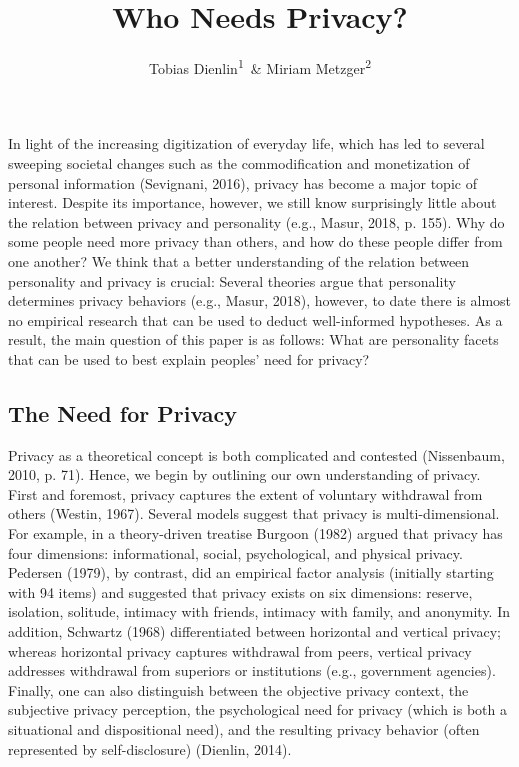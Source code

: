 \documentclass[man,floatsintext]{apa6}
\title{Who Needs Privacy?}
\author{Tobias Dienlin\textsuperscript{1}~\& Miriam Metzger\textsuperscript{2}}
\date{}
\affiliation{
\vspace{0.5cm}
\textsuperscript{1} University of Hohenheim\\\textsuperscript{2} University of California, Santa Barbara}
\begin{document}
\maketitle

In light of the increasing digitization of everyday life, which has led to several sweeping societal changes such as the commodification and monetization of personal information (Sevignani, 2016), privacy has become a major topic of interest. Despite its importance, however, we still know surprisingly little about the relation between privacy and personality (e.g., Masur, 2018, p. 155). Why do some people need more privacy than others, and how do these people differ from one another? We think that a better understanding of the relation between personality and privacy is crucial: Several theories argue that personality determines privacy behaviors (e.g., Masur, 2018), however, to date there is almost no empirical research that can be used to deduct well-informed hypotheses. As a result, the main question of this paper is as follows: What are personality facets that can be used to best explain peoples' need for privacy?

\hypertarget{the-need-for-privacy}{%
\subsection{The Need for Privacy}\label{the-need-for-privacy}}

Privacy as a theoretical concept is both complicated and contested (Nissenbaum, 2010, p. 71). Hence, we begin by outlining our own understanding of privacy. First and foremost, privacy captures the extent of voluntary withdrawal from others (Westin, 1967). Several models suggest that privacy is multi-dimensional. For example, in a theory-driven treatise Burgoon (1982) argued that privacy has four dimensions: informational, social, psychological, and physical privacy. Pedersen (1979), by contrast, did an empirical factor analysis (initially starting with 94 items) and suggested that privacy exists on six dimensions: reserve, isolation, solitude, intimacy with friends, intimacy with family, and anonymity. In addition, Schwartz (1968) differentiated between horizontal and vertical privacy; whereas horizontal privacy captures withdrawal from peers, vertical privacy addresses withdrawal from superiors or institutions (e.g., government agencies). Finally, one can also distinguish between the objective privacy context, the subjective privacy perception, the psychological need for privacy (which is both a situational and dispositional need), and the resulting privacy behavior (often represented by self-disclosure) (Dienlin, 2014).
\end{document}
